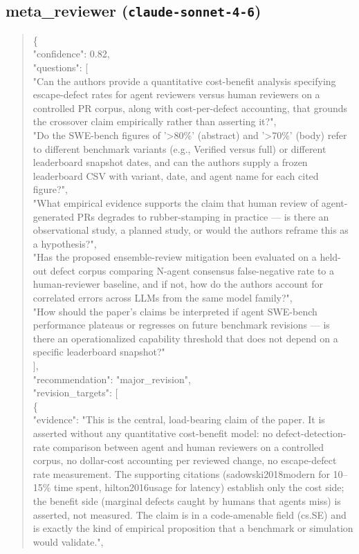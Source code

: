 \documentclass[11pt]{article}
\begin{document}
\subsection*{meta\_reviewer (\texttt{claude-sonnet-4-6})}
\begin{quote}\small\ttfamily\raggedright
\{\\
  "confidence": 0.82,\\
  "questions": [\\
    "Can the authors provide a quantitative cost-benefit analysis specifying escape-defect rates for agent reviewers versus human reviewers on a controlled PR corpus, along with cost-per-defect accounting, that grounds the crossover claim empirically rather than asserting it?",\\
    "Do the SWE-bench figures of '>80\%' (abstract) and '>70\%' (body) refer to different benchmark variants (e.g., Verified versus full) or different leaderboard snapshot dates, and can the authors supply a frozen leaderboard CSV with variant, date, and agent name for each cited figure?",\\
    "What empirical evidence supports the claim that human review of agent-generated PRs degrades to rubber-stamping in practice --- is there an observational study, a planned study, or would the authors reframe this as a hypothesis?",\\
    "Has the proposed ensemble-review mitigation been evaluated on a held-out defect corpus comparing N-agent consensus false-negative rate to a human-reviewer baseline, and if not, how do the authors account for correlated errors across LLMs from the same model family?",\\
    "How should the paper's claims be interpreted if agent SWE-bench performance plateaus or regresses on future benchmark revisions --- is there an operationalized capability threshold that does not depend on a specific leaderboard snapshot?"\\
  ],\\
  "recommendation": "major\_revision",\\
  "revision\_targets": [\\
    \{\\
      "evidence": "This is the central, load-bearing claim of the paper. It is asserted without any quantitative cost-benefit model: no defect-detection-rate comparison between agent and human reviewers on a controlled corpus, no dollar-cost accounting per reviewed change, no escape-defect rate measurement. The supporting citations (sadowski2018modern for 10--15\% time spent, hilton2016usage for latency) establish only the cost side; the benefit side (marginal defects caught by humans that agents miss) is asserted, not measured. The claim is in a code-amenable field (cs.SE) and is exactly the kind of empirical proposition that a benchmark or simulation would validate.",\\

\end{quote}
\end{document}
